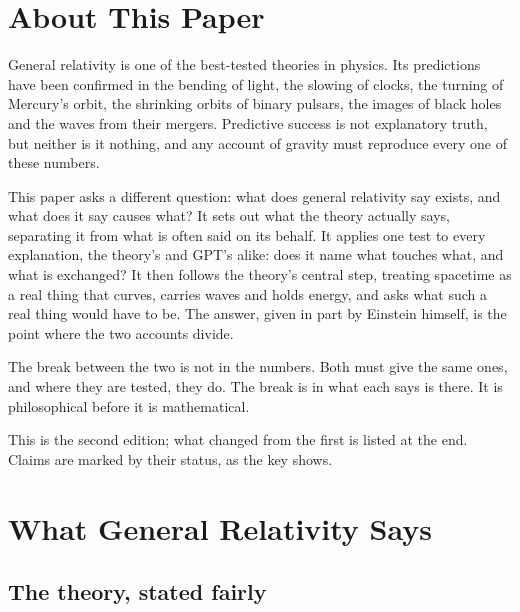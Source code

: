 \newcommand{\gptpart}{8}
\newcommand{\gpttitle}{Defining the Break}
\newcommand{\gptsubtitle}{The Irreconcilable Differences Between General Relativity and Graviton Pressure Theory}
\newcommand{\gptdate}{November 2026}

\graphicspath{{figs/}}

\gptitle

\section*{About This Paper}

General relativity is one of the best-tested theories in physics. Its predictions have been confirmed in the bending of light, the slowing of clocks, the turning of Mercury's orbit, the shrinking orbits of binary pulsars, the images of black holes and the waves from their mergers. Predictive success is not explanatory truth, but neither is it nothing, and any account of gravity must reproduce every one of these numbers.

This paper asks a different question: what does general relativity say exists, and what does it say causes what? It sets out what the theory actually says, separating it from what is often said on its behalf. It applies one test to every explanation, the theory's and GPT's alike: does it name what touches what, and what is exchanged? It then follows the theory's central step, treating spacetime as a real thing that curves, carries waves and holds energy, and asks what such a real thing would have to be. The answer, given in part by Einstein himself, is the point where the two accounts divide.

The break between the two is not in the numbers. Both must give the same ones, and where they are tested, they do. The break is in what each says is there. It is philosophical before it is mathematical.

This is the second edition; what changed from the first is listed at the end. Claims are marked by their status, as the key shows.

\statuskey

\section{What General Relativity Says}

\subsection{The theory, stated fairly}

